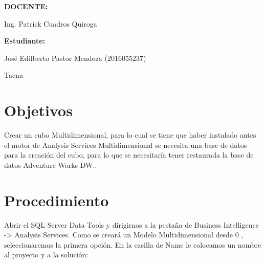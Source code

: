 \documentclass[12pt,letterpaper]{article}
\begin{document}
\begin{titlepage}
\begin{center}
\vspace*{0.3in}
\begin{Large}
\textbf{DOCENTE:} \\
\end{Large}

\vspace*{0.1in}
\begin{large}
 Ing. Patrick Cuadros Quiroga\\
\end{large}

\vspace*{0.4in}
\vspace*{0.1in}
\begin{large}
\textbf{Estudiante:} \\
\begin{flushleft}
José Edilberto Pastor Mendoza  \hfill	(2016055237)\\

\centering  %
\vspace*{0.9in}
\begin{large}
Tacna\\ 
\end{large}

\end{flushleft}
\end{large}
\end{center}

\end{titlepage}


\tableofcontents %
\thispagestyle{empty} %
\newpage
\setcounter{page}{1} %

\section{Objetivos}
Crear un cubo Multidimensional, para lo cual se tiene que haber instalado antes el motor de Analysis
Services Multidimensional se necesita una base de datos para la creación del cubo, para lo que se
necesitaría tener restaurada la base de datos Adventure Works DW..

\section{Procedimiento}

Abrir el SQL Server Data Tools y dirigirnos a la pestaña de Business Intelligence -> Analysis
Services. Como se creará un Modelo Multidimensional desde 0 , seleccionaremos la primera opción. En la
casilla de Name le colocamos un nombre al proyecto y a la solución:







\end{document}
